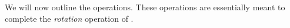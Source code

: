 {We will now outline the operations. These operations are essentially meant to complete the \emph{rotation} operation of \cite{iosif_deciding_2014}.

}
